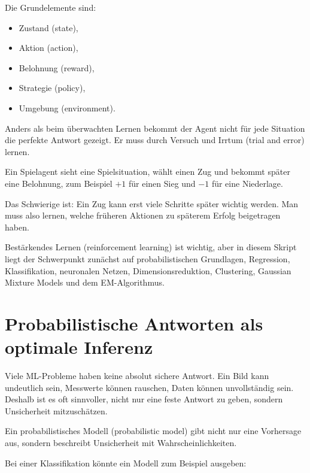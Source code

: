 Die Grundelemente sind:

\begin{itemize}
    \item Zustand (state),
    \item Aktion (action),
    \item Belohnung (reward),
    \item Strategie (policy),
    \item Umgebung (environment).
\end{itemize}

Anders als beim überwachten Lernen bekommt der Agent nicht für jede Situation die perfekte Antwort gezeigt.
Er muss durch Versuch und Irrtum (trial and error) lernen.

\begin{examplebox}
Ein Spielagent sieht eine Spielsituation, wählt einen Zug und bekommt später eine Belohnung, zum Beispiel \(+1\) für einen Sieg und \(-1\) für eine Niederlage.

Das Schwierige ist:
Ein Zug kann erst viele Schritte später wichtig werden.
Man muss also lernen, welche früheren Aktionen zu späterem Erfolg beigetragen haben.
\end{examplebox}

\begin{notebox}
Bestärkendes Lernen (reinforcement learning) ist wichtig, aber in diesem Skript liegt der Schwerpunkt zunächst auf probabilistischen Grundlagen, Regression, Klassifikation, neuronalen Netzen, Dimensionsreduktion, Clustering, Gaussian Mixture Models und dem EM-Algorithmus.
\end{notebox}

\section{Probabilistische Antworten als optimale Inferenz}

Viele ML-Probleme haben keine absolut sichere Antwort.
Ein Bild kann undeutlich sein, Messwerte können rauschen, Daten können unvollständig sein.
Deshalb ist es oft sinnvoller, nicht nur eine feste Antwort zu geben, sondern Unsicherheit mitzuschätzen.

\begin{conceptbox}
Ein probabilistisches Modell (probabilistic model) gibt nicht nur eine Vorhersage aus, sondern beschreibt Unsicherheit mit Wahrscheinlichkeiten.
\end{conceptbox}

Bei einer Klassifikation könnte ein Modell zum Beispiel ausgeben:

